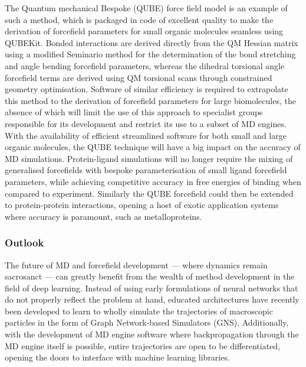 The Quantum mechanical Bespoke (QUBE) force field model is an example of such a method, which is packaged in code of excellent quality to make the derivation of forcefield parameters for small organic molecules seamless using QUBEKit.\cite{horton2019qubekit} Bonded interactions are derived directly from the QM Hessian matrix using a modified Seminario method for the determination of the bond stretching and angle bending forcefield parameters,\cite{allen2018harmonic} whereas the dihedral torsional angle forcefield terms are derived using QM torsional scans through constrained geometry optimisation. Software of similar efficiency is required to extrapolate this method to the derivation of forcefield parameters for large biomolecules, the absence of which will limit the use of this approach to specialist groups responsible for its development and restrict its use to a subset of MD engines. With the availability of efficient streamlined software for both small and large organic molecules, the QUBE technique will have a big impact on the accuracy of MD simulations. Protein-ligand simulations will no longer require the mixing of generalised forcefields with bespoke parameterisation of small ligand forcefield parameters, while achieving competitive accuracy in free energies of binding when compared to experiment.\cite{horton2020modelling} Similarly the QUBE forcefield could then be extended to protein-protein interactions, opening a host of exotic application systems where accuracy is paramount, such as metalloproteins. 

\subsubsection{Outlook}
The future of MD and forcefield development --- where dynamics remain sacrosanct --- can greatly benefit from the wealth of method development in the field of deep learning. Instead of using early formulations of neural networks that do not properly reflect the problem at hand, educated architectures have recently been developed to learn to wholly simulate the trajectories of macroscopic particles in the form of Graph Network-based Simulators (GNS).\cite{sanchez2020learning} Additionally, with the development of MD engine software where backpropagation through the MD engine itself is possible, entire trajectories are open to be differentiated, opening the doors to interface with machine learning libraries.\cite{jaxmd2020}\\

